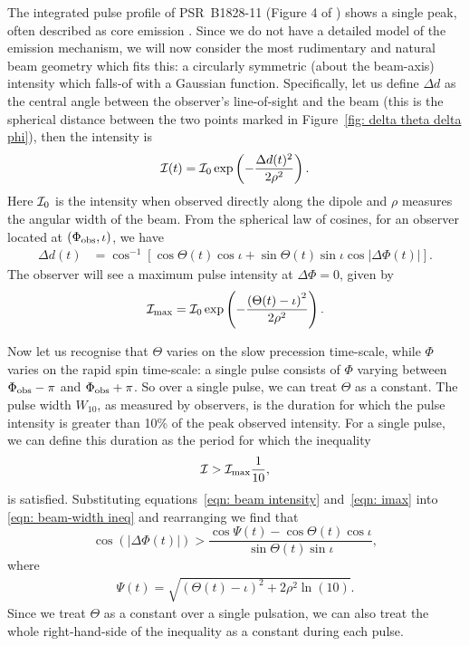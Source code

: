 \documentclass[../full_thesis/full_thesis.tex]{subfiles}
\begin{document}
The integrated pulse profile of PSR~B1828-11 (Figure 4 of \citet{Lyne2010})
shows a single peak, often described as  core emission \mbox{\citep{Lyne1988}}.  Since
we do not have a detailed model of the emission mechanism, we will now consider
the most rudimentary and natural beam geometry which fits this: a circularly
symmetric (about the beam-axis) intensity which falls-of with a Gaussian
function.  Specifically, let us define $\Delta d$ as the central angle between
the observer's line-of-sight and the beam (this is the spherical distance
between the two points marked in Figure~\ref{fig: delta theta delta phi}), then
the intensity is
\begin{equation}
\mathcal{I}(t) = \mathcal{I}_{0}\exp\left(-\frac{\Delta d(t)^{2}}{2\rho^{2}}\right).
\label{eqn: beam intensity}
\end{equation}
Here $\mathcal{I}_0$ is the intensity when observed directly along the dipole and
$\rho$ measures the angular width of the beam.
From the spherical law of cosines, for an observer located at $(\Phi_{\mathrm{obs}}, \iota)$,
we have
\begin{align}
\Delta d(t) &= \cos^{-1}\left[\cos\Theta(t)\cos\iota +
                              \sin\Theta(t)\sin\iota\cos|\Delta\Phi(t)|\right].
\label{eqn: angular sep}
\end{align}
The observer will see a maximum pulse intensity at $\Delta\Phi = 0$, given by
\begin{align}
\mathcal{I}_\textrm{max} = \mathcal{I}_{0} \exp\left(
    -\frac{\left(\Theta(t) - \iota\right)^{2}}
          {2\rho^{2}}\right).
\label{eqn: imax}
\end{align}

Now let us recognise that $\Theta$ varies on the slow precession time-scale,
while $\Phi$ varies on the rapid spin time-scale: a single pulse consists of
$\Phi$ varying between $\Phi_{\mathrm{obs}} - \pi$ and $\Phi_{\mathrm{obs}} + \pi$. So over a single pulse,
we can treat $\Theta$ as a constant. The pulse width $W_{10}$, as measured by
observers, is the duration for which the pulse intensity is greater than 10\%
of the peak observed intensity. For a single pulse, we can define this duration
as the period for which the inequality
\begin{align}
\mathcal{I} > \mathcal{I}_{\textrm{max}} \frac{1}{10},
\label{eqn: beam-width ineq}
\end{align}
is satisfied.  Substituting equations~\eqref{eqn: beam intensity}
and~\eqref{eqn: imax} into \eqref{eqn: beam-width ineq} and rearranging we find
that
\begin{equation}
\cos(|\Delta\Phi(t)|) > \frac{\cos\Psi(t)-\cos\Theta(t)\cos\iota}
    {\sin\Theta(t)\sin\iota},
\label{eqn: cos delta phi}
\end{equation}
where
\begin{align}
\Psi(t) = \sqrt{
    \left(\Theta(t) - \iota\right)^{2} +
     2\rho^{2} \ln\left(10\right)}.
\label{eqn: Psi}
\end{align}
Since we treat $\Theta$ as a constant over a single pulsation, we can also treat
the whole right-hand-side of the inequality as a constant during each pulse.
\end{document}
